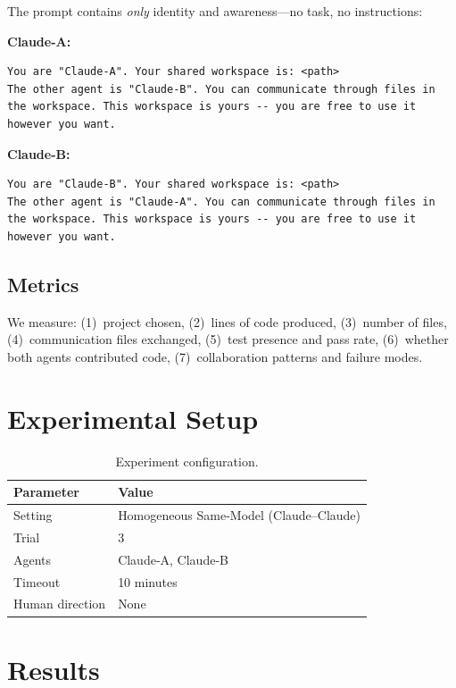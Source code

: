 \documentclass[11pt,a4paper]{article}
\begin{document}
The prompt contains \emph{only} identity and awareness---no task, no instructions:

\noindent\textbf{Claude-A:}
\begin{lstlisting}
You are "Claude-A". Your shared workspace is: <path>
The other agent is "Claude-B". You can communicate through files in the workspace. This workspace is yours -- you are free to use it however you want.
\end{lstlisting}

\noindent\textbf{Claude-B:}
\begin{lstlisting}
You are "Claude-B". Your shared workspace is: <path>
The other agent is "Claude-A". You can communicate through files in the workspace. This workspace is yours -- you are free to use it however you want.
\end{lstlisting}

\subsection{Metrics}

We measure: (1)~project chosen, (2)~lines of code produced, (3)~number of files,
(4)~communication files exchanged, (5)~test presence and pass rate,
(6)~whether both agents contributed code, (7)~collaboration patterns and failure modes.

\section{Experimental Setup}

\begin{table}[h]
\centering
\begin{tabular}{ll}
\toprule
\textbf{Parameter} & \textbf{Value} \\
\midrule
Setting & Homogeneous Same-Model (Claude--Claude) \\
Trial & 3 \\
Agents & Claude-A, Claude-B \\
Timeout & 10 minutes \\
Human direction & None \\
\bottomrule
\end{tabular}
\caption{Experiment configuration.}
\label{tab:config}
\end{table}

\section{Results}
\end{document}
